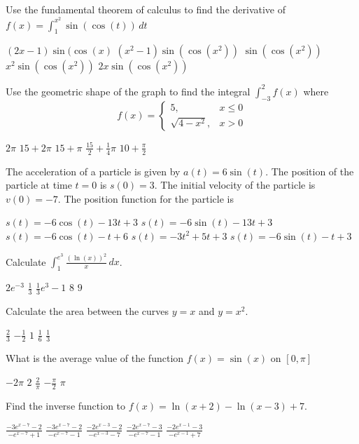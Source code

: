 \documentclass[11pt]{article}
\begin{document}
\begin{questions}
\begin{multiplechoice}{5}
\newpage

\question Use the fundamental theorem of calculus to find the derivative of 
$\displaystyle f(x) = \int_1^{x^2} \sin(\cos(t)) \, dt$
\begin{answers}{2}
\ans $(2x - 1) \sin(\cos(x)$
\ans $(x^2 - 1) \sin(\cos(x^2))$
\ans $\sin(\cos(x^2))$
\ans $x^2 \sin(\cos(x^2))$
\ans $2x \sin(\cos(x^2))$
\end{answers}

\question Use the geometric shape of the graph to find the integral 
$\displaystyle \int_{-3}^2 f(x)$ where 
$$ f(x) = 
\begin{cases}
5, & x \le 0 \\
\sqrt{4 - x^2}, & x > 0
\end{cases}
$$
\begin{answers}{2}
\ans $2\pi$
\ans $15 + 2\pi$
\ans $15 + \pi$
\ans $\frac{15}{2} + \frac{1}{4}\pi$
\ans $10  + \frac{\pi}{2}$
\end{answers}

\question The acceleration of a particle is given by $a(t) = 6\sin(t)$.  The position
of the particle at time $t = 0$ is $s(0) = 3$.  The initial velocity of the particle is $v(0) = -7$.
The position function for the particle is
\begin{answers}{2}
\ans $s(t) = -6 \cos(t) - 13t + 3$
\ans $s(t) = -6 \sin(t) - 13t + 3$
\ans $s(t) = -6 \cos(t) -t + 6$
\ans $s(t) = -3t^2 + 5t + 3$ 
\ans $s(t) = -6 \sin(t) -t + 3$
\end{answers}

\question Calculate $\int_1^{e^3} \frac{(\ln(x))^2}{x} \, dx$.
\begin{answers}{2}
\ans $2e^{-3}$
\ans $\frac{1}{3}$
\ans $\frac{1}{3} e^{3} - 1$
\ans $8$
\ans $9$ 
\end{answers}

\question Calculate the area between the curves $y = x$ and $y = x^2$.
\begin{answers}{3}
\ans $\frac 2 3$ 
\ans $- \frac 1 2$ 
\ans $1$ 
\ans $\frac 1 6$ 
\ans $\frac 1 3$ 
\end{answers}

\question What is the average value of the function $f(x) = \sin(x)$ on $[0, \pi]$
\begin{answers}{3}
\ans $-2\pi$
\ans $2$
\ans $\frac{2}{\pi}$
\ans $-\frac{\pi}{2}$
\ans $\pi$
\end{answers}


\question Find the inverse function to $f(x) = \ln(x+2) - \ln(x-3) + 7$.
\begin{answers}{2}
\ans $\frac{-3e^{x-7} - 2}{-e^{x-7} + 1}$
\ans $\frac{-3e^{x-7} - 2}{-e^{x-7} - 1}$
\ans $\frac{-2e^{x-3} - 2}{-e^{x-3} - 7}$
\ans $\frac{-2e^{x-7} - 3}{-e^{x-7} - 1}$
\ans $\frac{-2e^{x-1} - 3}{-e^{x-1} + 7}$
\end{answers}

\end{multiplechoice}
\end{questions}
\end{document}

